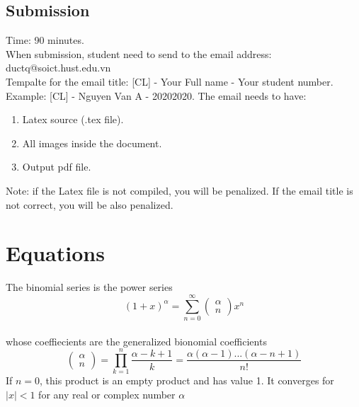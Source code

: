 \documentclass{article}
\begin{document}
\subsection{Submission}
Time: 90 minutes.\\
When submission, student need to send to the email address: ductq@soict.hust.edu.vn\\
Tempalte for the email title: [CL] - Your Full name - Your student number.\\
Example: [CL] - Nguyen Van A - 20202020. The email needs to have:\\
\begin{enumerate}
\item Latex source (.tex file).
\item All images inside the document.
\item Output pdf file.
\end{enumerate}
Note: if the Latex file is not compiled, you will be penalized. If the email title is not correct, you will be also penalized.\\
\section{Equations}
The binomial series is the power series
\begin{equation}
(1+x)^\alpha = \sum_{n=0}^\infty
\left (
\begin{array}{c}
\alpha\\
n
\end{array}
\right )
x^n
\label{eq:1}
\end{equation}
\\whose coeffiecients are the generalized bionomial coefficients
\begin{equation}
\left (
\begin{array}{c}
\alpha\\
n
\end{array}
\right )
=\prod_{k=1}^{n}\frac{\alpha-k+1}{k}=\frac{\alpha (\alpha-1)...(\alpha-n+1)}{n!}
\label{eq:2}
\end{equation}
If $n=0$, this product is an empty product and has value 1. It converges for $|x|<1$ for any real or complex number $\alpha$
\end{document}
